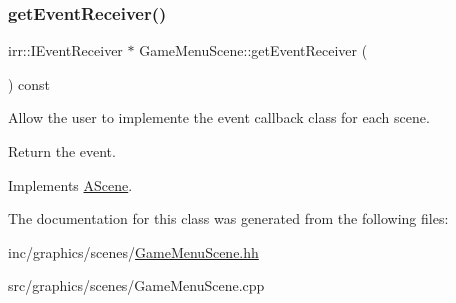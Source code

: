 \subsubsection{\texorpdfstring{get\+Event\+Receiver()}{getEventReceiver()}}
{\footnotesize\ttfamily irr\+::\+I\+Event\+Receiver $\ast$ Game\+Menu\+Scene\+::get\+Event\+Receiver (\begin{DoxyParamCaption}{ }\end{DoxyParamCaption}) const\hspace{0.3cm}{\ttfamily [virtual]}}



Allow the user to implemente the event callback class for each scene. 

Return the event. 

Implements \hyperlink{classAScene_af521e5e6d30a5d2e5d30eb333e4d3abd}{A\+Scene}.



The documentation for this class was generated from the following files\+:\begin{DoxyCompactItemize}
\item 
inc/graphics/scenes/\hyperlink{GameMenuScene_8hh}{Game\+Menu\+Scene.\+hh}\item 
src/graphics/scenes/Game\+Menu\+Scene.\+cpp\end{DoxyCompactItemize}

